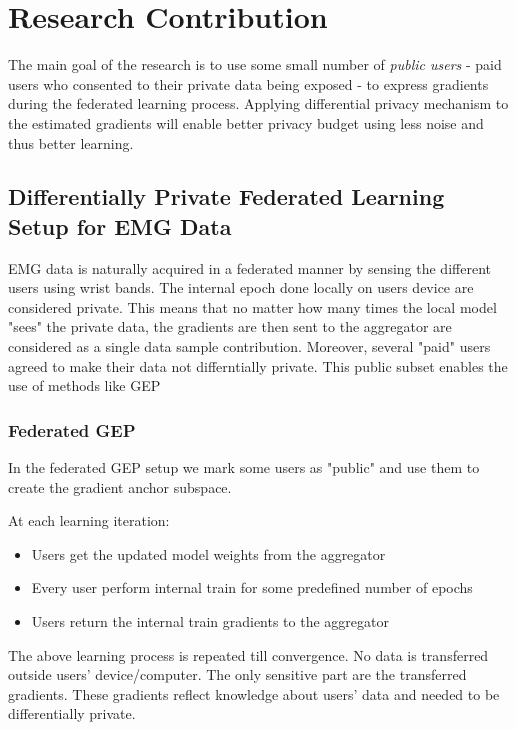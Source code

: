 \chapter{Research Contribution}
The main goal of the research is to use some small number of \textit{public users} - paid users who consented to their private data being exposed - to express gradients during the federated learning process. Applying differential privacy mechanism to the estimated gradients will enable better privacy budget using less noise and thus better learning.
\section{Differentially Private Federated Learning  Setup for EMG Data }
EMG data is naturally acquired in a federated manner by sensing the different users using wrist bands. The internal epoch done locally on users device are considered private. This means that no matter how many times the local model "sees" the private data, the gradients are then sent to the aggregator are considered as a single data sample contribution. Moreover, several "paid" users agreed to make their data not differntially private. This public subset enables the use of methods like GEP \cite{Yu2021DoLearning} 
\subsection{Federated GEP}
In the federated GEP setup we mark some users as "public" and use them to create the gradient anchor subspace. 

At each learning iteration:
\begin{itemize}
    \item Users get the updated model weights from the aggregator
    \item Every user perform internal train for some predefined number of epochs
    \item Users return the internal train gradients to the aggregator
\end{itemize}
 The above learning process is repeated till convergence. No data is transferred outside users' device/computer. The only sensitive part are the transferred gradients. These gradients reflect knowledge about users' data and needed to be differentially private.
